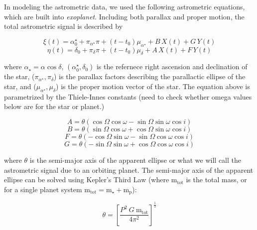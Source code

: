 \documentclass[twocolumn]{aastex631}
\newcommand{\dycomment}[1]{{\color{purple}#1}}
\begin{document}
In modeling the astrometric data, we used the following astrometric equations, which are built into \textit{exoplanet}. Including both parallax and proper motion, the total astrometric signal is described by 


\begin{equation} \label{eq: astrometric_xi}
   \xi (t) = \alpha_0^\star + \pi_{\alpha^\star}{\pi} + (t - t_0)\mu_{\alpha^\star} + B \, X(t) + G \, Y(t)
\end{equation}
\begin{equation}
    \eta (t) = \delta_0 + \pi_{\delta}{\pi} + (t - t_0)\mu_{\delta} + A \, X(t) + F \, Y(t)
\end{equation}    

where $\alpha_{\star} = \alpha \cos \delta$, $(\alpha_0^\star, \delta_0)$ is the refernece right ascension and declination of the star, ($\pi_{\alpha^\star}, \pi_{\delta}$) is the parallax factors describing the parallactic ellipse of the star, and ($\mu_{\alpha^\star}, \mu_{\delta}$) is the proper motion vector of the star. The equation above is parametrized by the Thiele-Innes constants (\dycomment{need to check whether omega values below are for the star or planet}.)

\begin{equation}
    A = \theta (\cos\Omega \cos\omega - \sin\Omega \sin\omega \cos i)
\end{equation}
\begin{equation}
    B = \theta (\sin\Omega \cos\omega + \cos\Omega \sin\omega \cos i)
\end{equation}   
\begin{equation}
    F = \theta (-\cos\Omega \sin\omega - \sin\Omega \cos\omega \cos i)
\end{equation}    
\begin{equation}
    G = \theta (-\sin\Omega \sin\omega + \cos\Omega \cos\omega \cos i)
\end{equation}

where $\theta$ is the semi-major axis of the apparent ellipse or what we will call the astrometric signal due to an orbiting planet. The semi-major axis of the apparent ellipse can be solved using Kepler's Third Law (where m$_{\textrm{tot}}$ is the total mass, or for a single planet system $\textrm{m}_{\textrm{tot}} = \textrm{m}_{\star} + \textrm{m}_{\textrm{p}}$):

\begin{equation}
\theta = [\frac{P^2 \: G \: \textrm{m}_{\textrm{tot}}}{4\pi^2}]^{\frac{1}{3}}
\end{equation}
\end{document}
